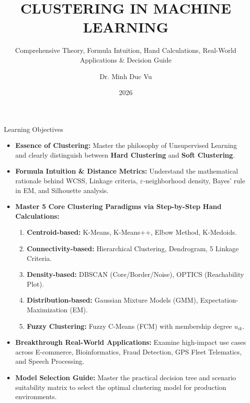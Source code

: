 \documentclass[aspectratio=169,10pt]{beamer}
\title[Clustering in Machine Learning]{\Large \textbf{CLUSTERING IN MACHINE LEARNING}}
\subtitle{\normalsize Comprehensive Theory, Formula Intuition, Hand Calculations, Real-World Applications \& Decision Guide}
\author[Dr. Minh Duc Vu]{Dr. Minh Duc Vu}
\institute[NEU]{Department of Data Science and Artificial Intelligence\\College of Technology -- National Economics University (NEU)}
\date{2026}
\begin{document}
\begin{frame}
  \titlepage
\end{frame}

\begin{frame}{Learning Objectives}
  \small
  \begin{itemize}\setlength{\itemsep}{2.5pt}
    \item \textbf{Essence of Clustering:} Master the philosophy of Unsupervised Learning and clearly distinguish between \textbf{Hard Clustering} and \textbf{Soft Clustering}.
    \item \textbf{Formula Intuition \& Distance Metrics:} Understand the mathematical rationale behind WCSS, Linkage criteria, $\varepsilon$-neighborhood density, Bayes' rule in EM, and Silhouette analysis.
    \item \textbf{Master 5 Core Clustering Paradigms via Step-by-Step Hand Calculations:}
      \begin{enumerate}\setlength{\itemsep}{1.5pt}
        \item \textbf{Centroid-based:} K-Means, K-Means++, Elbow Method, K-Medoids.
        \item \textbf{Connectivity-based:} Hierarchical Clustering, Dendrogram, 5 Linkage Criteria.
        \item \textbf{Density-based:} DBSCAN (Core/Border/Noise), OPTICS (Reachability Plot).
        \item \textbf{Distribution-based:} Gaussian Mixture Models (GMM), Expectation-Maximization (EM).
        \item \textbf{Fuzzy Clustering:} Fuzzy C-Means (FCM) with membership degree $u_{ik}$.
      \end{enumerate}
    \item \textbf{Breakthrough Real-World Applications:} Examine high-impact use cases across E-commerce, Bioinformatics, Fraud Detection, GPS Fleet Telematics, and Speech Processing.
    \item \textbf{Model Selection Guide:} Master the practical decision tree and scenario suitability matrix to select the optimal clustering model for production environments.
  \end{itemize}
\end{frame}
\end{document}
